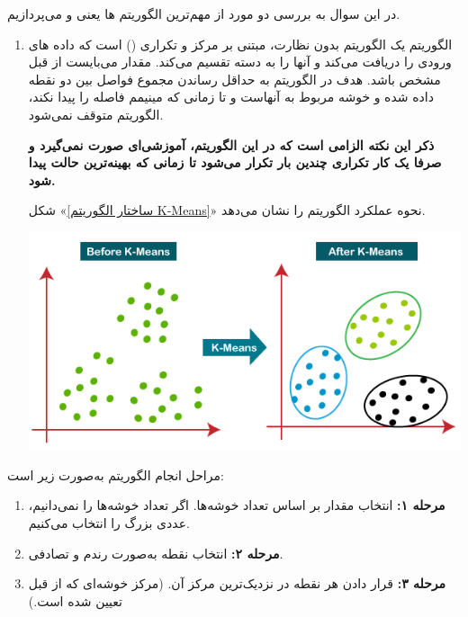 \begin{enumerate}
\begin{qsolve}
	در این سوال به بررسی دو مورد از مهم‌ترین الگوریتم ها یعنی  و  می‌پردازیم.
	
	\begin{enumerate}
		\item {}
		الگوریتم  یک الگوریتم بدون نظارت، مبتنی بر مرکز و تکراری () است که داده های ورودی را دریافت می‌کند و آنها را به  دسته تقسیم می‌کند. مقدار  می‌بایست از قبل مشخص باشد. هدف در الگوریتم  به حداقل رساندن مجموع فواصل بین دو نقطه داده شده و خوشه مربوط به آنهاست و تا زمانی که مینیمم فاصله را پیدا نکند، الگوریتم متوقف نمی‌شود.
		
		\textbf{ذکر این نکته الزامی است که در این الگوریتم، آموزشی‌ای صورت نمی‌گیرد و صرفا یک کار تکراری چندین بار تکرار می‌شود تا زمانی که بهینه‌ترین حالت پیدا شود.}
		
		شکل «\ref{ساختار الگوریتم K-Means}» نحوه عملکرد الگوریتم  را نشان می‌دهد.
	
	
	\begin{center}
		\includegraphics*[width=0.7\linewidth]{pics/img2.png}
		\label{ساختار الگوریتم K-Means}
	\end{center}
	
	
	\end{enumerate}
	
\end{qsolve}
	
	
	
\begin{qsolve}
مراحل انجام الگوریتم  به‌صورت زیر است:

\begin{enumerate}
	\item \textbf{مرحله ۱: } انتخاب مقدار  بر اساس تعداد خوشه‌ها. اگر تعداد خوشه‌ها را نمی‌دانیم، عددی بزرگ را انتخاب می‌کنیم.
	
	\item \textbf{مرحله ۲:} انتخاب  نقطه به‌صورت رندم و تصادفی.
	
	\item \textbf{مرحله ۳:} قرار دادن هر نقطه در نزدیک‌ترین مرکز آن. (مرکز  خوشه‌ای که از قبل تعیین شده است.)
	

\end{enumerate}
\end{qsolve}
\end{enumerate}
